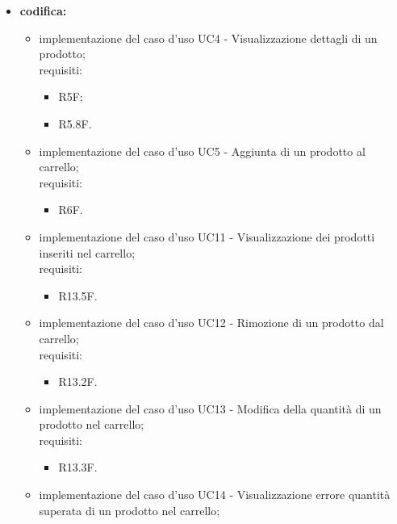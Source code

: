 \begin{itemize}
    \item \textbf{codifica:}
          \begin{itemize}
              \item implementazione del caso d'uso UC4 - Visualizzazione dettagli di un prodotto;\\
                    requisiti:
                    \begin{itemize}
                        \item R5F;
                        \item R5.8F.
                    \end{itemize}
              \item implementazione del caso d'uso UC5 - Aggiunta di un prodotto al carrello;\\
                    requisiti:
                    \begin{itemize}
                        \item R6F.
                    \end{itemize}
              \item implementazione del caso d'uso UC11 - Visualizzazione dei prodotti inseriti nel carrello;\\
                    requisiti:
                    \begin{itemize}
                        \item R13.5F.
                    \end{itemize}
              \item implementazione del caso d'uso UC12 - Rimozione di un prodotto dal carrello;\\
                    requisiti:
                    \begin{itemize}
                        \item R13.2F.
                    \end{itemize}
              \item implementazione del caso d'uso UC13 - Modifica della quantità di un prodotto nel carrello;\\
                    requisiti:
                    \begin{itemize}
                        \item R13.3F.
                    \end{itemize}
              \item implementazione del caso d'uso UC14 - Visualizzazione errore quantità superata di un prodotto nel carrello;\\

\end{itemize}
\end{itemize}

